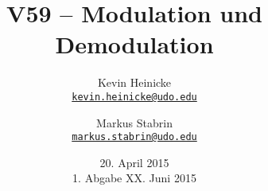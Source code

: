 


\title{%
    V59 -- Modulation und Demodulation
}
\author{%
    Kevin Heinicke\\
    \texttt{\href{mailto:kevin.heinicke@udo.edu}{kevin.heinicke@udo.edu}}
    \and
    Markus Stabrin\\
    \texttt{\href{mailto:markus.stabrin@udo.edu}{markus.stabrin@udo.edu}}
}
\date{%
    20. April 2015\\
    {\small 1. Abgabe} XX. Juni 2015
}

    \maketitle%
    \tableofcontents
    \newpage
    
    

    \printbibliography

